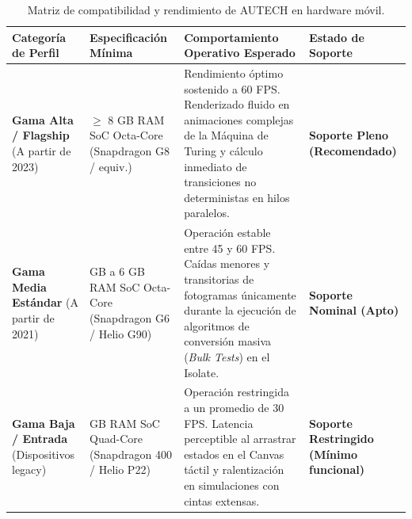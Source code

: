 \begin{table}[htbp]
\centering
\caption{Matriz de compatibilidad y rendimiento de AUTECH en hardware móvil.}
\label{tab:matriz_hardware_movil}
\setlength{\tabcolsep}{4pt}
\renewcommand{\arraystretch}{1.2}
\scriptsize
\begin{tabularx}{\textwidth}{@{} >{\raggedright\arraybackslash}p{2.8cm} >{\raggedright\arraybackslash}p{2.4cm} >{\raggedright\arraybackslash}X >{\raggedleft\arraybackslash}p{3cm} @{}}
\toprule
\textbf{Categoría de Perfil} &
\textbf{Especificación Mínima} &
\textbf{Comportamiento Operativo Esperado} &
\textbf{Estado de Soporte} \\
\midrule

\textbf{Gama Alta / Flagship} \newline (A partir de 2023)
  & $\ge$ 8 GB RAM \newline SoC Octa-Core \newline (Snapdragon G8 / equiv.)
  & Rendimiento óptimo sostenido a 60 FPS. Renderizado fluido en animaciones complejas de la Máquina de Turing y cálculo inmediato de transiciones no deterministas en hilos paralelos.
  & \textcolor{green!70!black}{\textbf{Soporte Pleno \newline (Recomendado)}} \\
\midrule

\textbf{Gama Media Estándar} \newline (A partir de 2021)
  & 4 GB a 6 GB RAM \newline SoC Octa-Core \newline (Snapdragon G6 / Helio G90)
  & Operación estable entre 45 y 60 FPS. Caídas menores y transitorias de fotogramas únicamente durante la ejecución de algoritmos de conversión masiva (\textit{Bulk Tests}) en el Isolate.
  & \textcolor{blue!70!black}{\textbf{Soporte Nominal \newline (Apto)}} \\
\midrule

\textbf{Gama Baja / Entrada} \newline (Dispositivos legacy)
  & 3 GB RAM \newline SoC Quad-Core \newline (Snapdragon 400 / Helio P22)
  & Operación restringida a un promedio de 30 FPS. Latencia perceptible al arrastrar estados en el Canvas táctil y ralentización en simulaciones con cintas extensas.
  & \textcolor{orange!80!black}{\textbf{Soporte Restringido \newline (Mínimo funcional)}} \\
\midrule


\end{tabularx}
\end{table}

